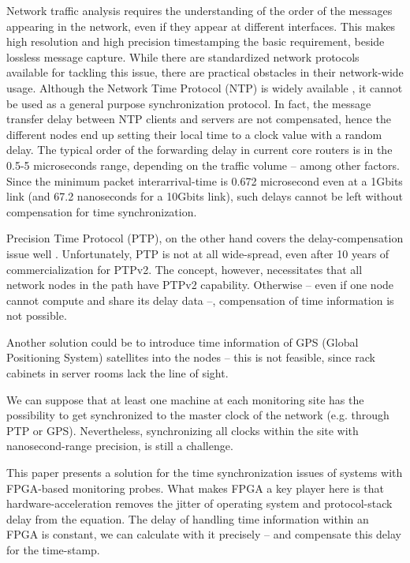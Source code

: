 \documentclass[journal]{IEEEtran}
\begin{document}
Network traffic analysis requires the understanding of the order of the messages appearing in the network, even if they appear at different interfaces. This makes high resolution and high precision timestamping the basic requirement, beside lossless message capture. 
While there are standardized network protocols available for tackling this issue, there are practical obstacles in their network-wide usage. Although the Network Time Protocol (NTP) is widely available \cite{NTP_book}, it cannot be used as a general purpose synchronization protocol. In fact, the message transfer delay between NTP clients and servers are not compensated, hence the different nodes end up setting their local time to a clock value with a random delay. The typical order of the forwarding delay in current core routers is in the 0.5-5 microseconds range, depending on the traffic volume -- among other factors. Since the minimum packet interarrival-time is 0.672 microsecond even at a 1Gbit\/s link (and 67.2 nanoseconds for a 10Gbit\/s link), such delays cannot be left without compensation for time synchronization.

Precision Time Protocol (PTP), on the other hand covers the delay-compensation issue well \cite{PTP_standard}. Unfortunately, PTP is not at all wide-spread, even after 10 years of commercialization for PTPv2. The concept, however, necessitates that all network nodes in the path have PTPv2 capability. Otherwise -- even if one node cannot compute and share its delay data --, compensation of time information is not possible.

Another solution could be to introduce time information of GPS (Global Positioning System) satellites into the nodes -- this is not feasible, since rack cabinets in server rooms lack the line of sight.

We can suppose that at least one machine at each monitoring site has the possibility to get synchronized to the master clock of the network (e.g. through PTP or GPS). Nevertheless, synchronizing all clocks within the site with nanosecond-range precision, is still a challenge.

This paper presents a solution for the time synchronization issues of systems with FPGA-based monitoring probes. What makes FPGA a key player here is that hardware-acceleration removes the jitter of operating system and protocol-stack delay from the equation. The delay of handling time information within an FPGA is constant, we can calculate with it precisely -- and compensate this delay for the time-stamp.
\end{document}

